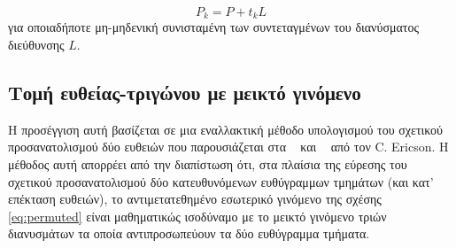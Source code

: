 \begin{equation}
P_k = P + t_k L
\label{eq:para} 
\end{equation}
για οποιαδήποτε μη-μηδενική συνισταμένη των συντεταγμένων του διανύσματος διεύθυνσης $L$.

\subsection{Τομή ευθείας-τριγώνου με μεικτό γινόμενο}
\label{chapter:stpalg}
\noindent  Η προσέγγιση αυτή βασίζεται σε μια εναλλακτική μέθοδο υπολογισμού του σχετικού προσανατολισμού δύο ευθειών που παρουσιάζεται στα ~\cite{ericson2005real} και ~\cite{ericson2007blog} από τον C. Ericson. Η μέθοδος αυτή απορρέει από την διαπίστωση ότι, στα πλαίσια της εύρεσης του σχετικού προσανατολισμού δύο κατευθυνόμενων ευθύγραμμων τμημάτων (και κατ' επέκταση ευθειών), το αντιμετατεθημένο εσωτερικό γινόμενο της σχέσης \eqref{eq:permuted} είναι μαθηματικώς ισοδύναμο με το μεικτό γινόμενο τριών διανυσμάτων τα οποία αντιπροσωπεύουν τα δύο ευθύγραμμα τμήματα.

